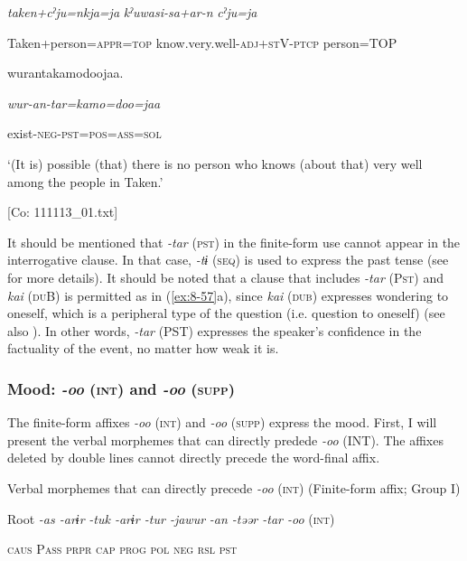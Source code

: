     \textit{taken+cˀju=nkja=ja}  \textit{kˀuwasi-sa+ar-n}  \textit{cˀju=ja}

    Taken+person=\textsc{appr}=\textsc{top}  know.very.well-\textsc{adj}+\textsc{st}V-\textsc{ptcp}  person=TOP

    wurantakamodoojaa.

    \textit{wur-an-tar=kamo=doo=jaa}

    exist-\textsc{neg}-\textsc{pst}=\textsc{pos}=\textsc{ass}=\textsc{sol}

    ‘(It is) possible (that) there is no person who knows (about that) very well among the people in Taken.’

    [Co: 111113\_01.txt]
\z

  It should be mentioned that \textit{{}-tar} (\textsc{pst}) in the finite-form use cannot appear in the interrogative clause. In that case, \textit{{}-tɨ} (\textsc{seq}) is used to express the past tense (see  for more details). It should be noted that a clause that includes \textit{{}-tar} (P\textsc{st}) and \textit{kai} (\textsc{du}B) is permitted as in (\ref{ex:8-57}a), since \textit{kai} (\textsc{dub}) expresses wondering to oneself, which is a peripheral type of the question (i.e. question to oneself) (see also ). In other words, \textit{{}-tar} (PST) expresses the speaker’s confidence in the factuality of the event, no matter how weak it is.

\subsubsection{Mood: \textit{{}-oo} (\textsc{int}) and \textit{{}-oo} (\textsc{supp})}

The finite-form affixes \textit{-oo} (\textsc{int}) and \textit{{}-oo} (\textsc{supp}) express the mood. First, I will present the verbal morphemes that can directly predede \textit{{}-oo} (INT). The affixes deleted by double lines cannot directly precede the word-final affix.

\ea\label{ex:8-58}
  Verbal morphemes that can directly precede \textit{-oo} (\textsc{int}) (Finite-form affix; Group I)

  Root  \textit{{}-as  {}-arɨr} %
\textit{{}-tuk  {}-arɨr  {}-tur  {}-jawur} %
\textit{{}-an  {}-təər  {}-tar  {}-oo} (\textsc{int})

    \textsc{caus}  P\textsc{ass}  \textsc{prpr}  \textsc{cap}  \textsc{prog}  \textsc{pol}  \textsc{neg}  \textsc{rsl}  \textsc{pst}

